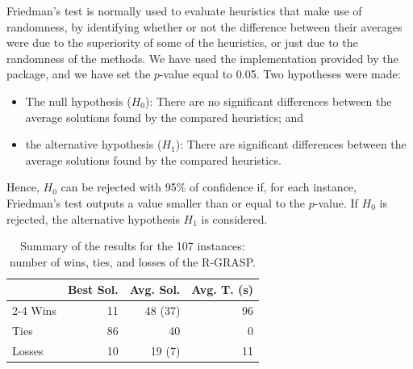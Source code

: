 \documentclass{ro}
\begin{document}
Friedman's test is normally used to evaluate heuristics that make use of randomness, by identifying whether or not the difference between their averages were due to the superiority of some of the heuristics, or just due to the randomness of the methods. We have used the implementation  provided by the \cite{r-package} package, and  we have set the $p$-value equal to 0.05. Two hypotheses were made:

\begin{itemize}
	\item The null hypothesis ($H_0$): There are no significant differences between the average solutions found by the compared heuristics; and
	\item the alternative hypothesis ($H_1$): There are significant differences between the average solutions found by the compared heuristics.
\end{itemize}

Hence, $H_0$ can be rejected with 95\% of confidence if, for each instance, Friedman's test outputs a value smaller than or equal to the $p$-value. If $H_0$ is rejected, the alternative hypothesis $H_1$ is considered.




\begin{table}[!htb]
	\centering
	\caption{Summary of the results for the 107 instances: number of wins, ties, and losses of the R-GRASP.}
		\begin{tabular}{lrrr} 
			\hline
			& \multicolumn{1}{l}{Best Sol.} & \multicolumn{1}{l}{Avg. Sol.} & \multicolumn{1}{l}{Avg. T. (s)}  \\ 
			\cline{2-4}
			Wins  & 11                             & 48 (37)                             & 96                                \\ 
			
			Ties  & 86                             & 40                             & 0                                 \\ 
			
			Losses & 10                             & 19 (7)                             & 11                                \\
			\hline
		\end{tabular}
	
	\label{tab:sum}
\end{table}
\end{document}
